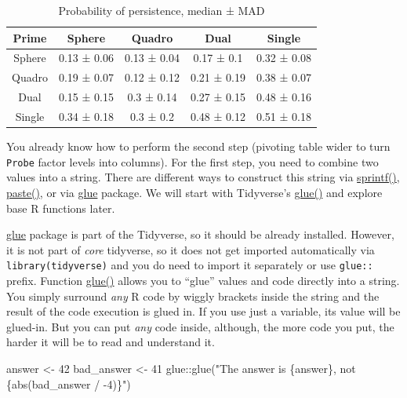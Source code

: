 \documentclass[
]{book}
\newenvironment{Shaded}{\begin{snugshade}}{\end{snugshade}}
\newcommand{\DecValTok}[1]{\textcolor[rgb]{0.00,0.00,0.81}{#1}}
\newcommand{\FunctionTok}[1]{\textcolor[rgb]{0.00,0.00,0.00}{#1}}
\newcommand{\NormalTok}[1]{#1}
\newcommand{\OtherTok}[1]{\textcolor[rgb]{0.56,0.35,0.01}{#1}}
\newcommand{\SpecialCharTok}[1]{\textcolor[rgb]{0.00,0.00,0.00}{#1}}
\newcommand{\StringTok}[1]{\textcolor[rgb]{0.31,0.60,0.02}{#1}}
\begin{document}
\begin{table}

\caption{\label{tab:unnamed-chunk-295}Probability of persistence, median ± MAD}
\centering
\begin{tabular}[t]{c|c|c|c|c}
\hline
Prime & Sphere & Quadro & Dual & Single\\
\hline
Sphere & 0.13 ± 0.06 & 0.13 ± 0.04 & 0.17 ± 0.1 & 0.32 ± 0.08\\
\hline
Quadro & 0.19 ± 0.07 & 0.12 ± 0.12 & 0.21 ± 0.19 & 0.38 ± 0.07\\
\hline
Dual & 0.15 ± 0.15 & 0.3 ± 0.14 & 0.27 ± 0.15 & 0.48 ± 0.16\\
\hline
Single & 0.34 ± 0.18 & 0.3 ± 0.2 & 0.48 ± 0.12 & 0.51 ± 0.18\\
\hline
\end{tabular}
\end{table}

You already know how to perform the second step (pivoting table wider to turn \texttt{Probe} factor levels into columns). For the first step, you need to combine two values into a string. There are different ways to construct this string via \href{https://stat.ethz.ch/R-manual/R-devel/library/base/html/sprintf.html}{sprintf()}, \href{https://stat.ethz.ch/R-manual/R-devel/library/base/html/paste.html}{paste()}, or via \href{https://glue.tidyverse.org/}{glue} package. We will start with Tidyverse's \href{https://glue.tidyverse.org/reference/glue.html}{glue()} and explore base R functions later.

\href{https://glue.tidyverse.org/}{glue} package is part of the Tidyverse, so it should be already installed. However, it is not part of \emph{core} tidyverse, so it does not get imported automatically via \texttt{library(tidyverse)} and you do need to import it separately or use \texttt{glue::} prefix. Function \href{https://glue.tidyverse.org/reference/glue.html}{glue()} allows you to ``glue'' values and code directly into a string. You simply surround \emph{any} R code by wiggly brackets inside the string and the result of the code execution is glued in. If you use just a variable, its value will be glued-in. But you can put \emph{any} code inside, although, the more code you put, the harder it will be to read and understand it.

\begin{Shaded}
\begin{Highlighting}[]
\NormalTok{answer }\OtherTok{\textless{}{-}} \DecValTok{42}
\NormalTok{bad\_answer }\OtherTok{\textless{}{-}} \DecValTok{41}
\NormalTok{glue}\SpecialCharTok{::}\FunctionTok{glue}\NormalTok{(}\StringTok{"The answer is \{answer\}, not \{abs(bad\_answer / {-}4)\}"}\NormalTok{)}
\end{Highlighting}
\end{Shaded}
\end{document}
